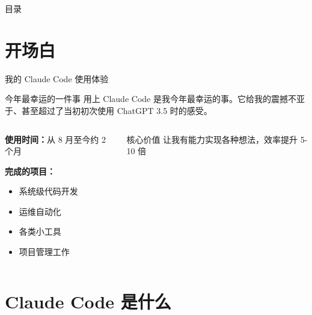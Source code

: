\documentclass[aspectratio=169,xcolor=dvipsnames]{beamer}
\begin{document}
\begin{frame}[plain]
  \titlepage
\end{frame}

\begin{frame}[plain]{目录}
  \tableofcontents
\end{frame}

\section{开场白}

\begin{frame}{我的 Claude Code 使用体验}
  \begin{block}{今年最幸运的一件事}
    用上 Claude Code 是我今年最幸运的事。它给我的震撼不亚于、甚至超过了当初初次使用 ChatGPT 3.5 时的感受。
  \end{block}

  \vspace{0.5cm}

  \begin{columns}
    \begin{column}{0.48\textwidth}
      \textbf{使用时间：}从 8 月至今约 2 个月

      \vspace{0.3cm}

      \textbf{完成的项目：}
      \begin{itemize}
        \item 系统级代码开发
        \item 运维自动化
        \item 各类小工具
        \item 项目管理工作
      \end{itemize}
    \end{column}
    \begin{column}{0.48\textwidth}
      \begin{alertblock}{核心价值}
        让我有能力实现各种想法，效率提升 5-10 倍
      \end{alertblock}
    \end{column}
  \end{columns}
\end{frame}

\section{Claude Code 是什么}
\end{document}
